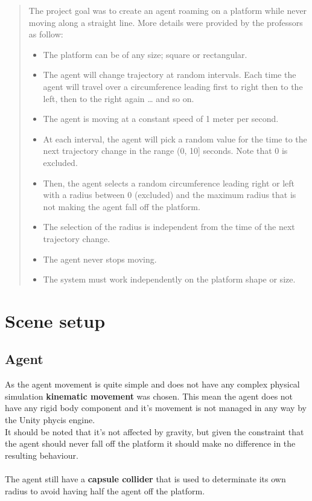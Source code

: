 \documentclass[12pt, a4paper]{article}
\begin{document}
\begin{abstract}
\noindent The project goal was to create an agent roaming on a platform while never moving along a straight line. More details were provided by the professors as follow:
\begin{itemize}
\item The platform can be of any size; square or rectangular.
\item The agent will change trajectory at random intervals. Each time the agent will travel over a
circumference leading first to right then to the left, then to the right again … and so on.
\item The agent is moving at a constant speed of 1 meter per second.
\item At each interval, the agent will pick a random value for the time to the next trajectory change
in the range (0, 10] seconds. Note that 0 is excluded.
\item Then, the agent selects a random circumference leading right or left with a radius between 0
(excluded) and the maximum radius that is not making the agent fall off the platform.
\item The selection of the radius is independent from the time of the next trajectory change.
\item The agent never stops moving.
\item The system must work independently on the platform shape or size.
\end{itemize}
\end{abstract}

\section{Scene setup}
\subsection{Agent}
As the agent movement is quite simple and does not have any complex physical simulation \textbf{kinematic movement} was chosen. This mean the agent does not have any rigid body component and it's movement is not managed
in any way by the Unity phycis engine.\\
It should be noted that it's not affected by gravity, but given the constraint that the agent should never fall off the platform it should make no difference in the resulting behaviour.\\\\
The agent still have a \textbf{capsule collider} that is used to determinate its own radius to avoid having half the agent off the platform.
\end{document}
